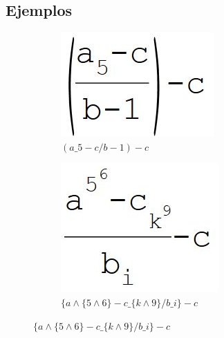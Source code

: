 \newpage
\subsection{Ejemplos}
\begin{figure}[htbp]
	\centering
	\begin{subfigure}[b]{0.3\textwidth}
	  \includegraphics[width=\textwidth]{imgs/test1}
	  \caption{$(a \_ 5-c/b-1)-c$}
	\end{subfigure}
	\quad
	\begin{subfigure}[b]{0.3\textwidth}
	  \includegraphics[width=\textwidth]{imgs/test2}
	  \caption{$\{a \wedge \{5 \wedge 6\}-c \_ \{k \wedge 9\}/b \_ i\}-c$}
	\end{subfigure}

\end{figure}
